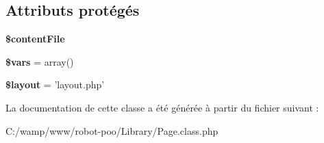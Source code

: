 \subsection*{Attributs protégés}
\begin{DoxyCompactItemize}
\item 
\hypertarget{class_library_1_1_page_a0eabc4b2c6966b79d36c81c4fa3ad3a8}{{\bfseries \$content\+File}}\label{class_library_1_1_page_a0eabc4b2c6966b79d36c81c4fa3ad3a8}

\item 
\hypertarget{class_library_1_1_page_a09f2c833c130b4443725fb576d9d5269}{{\bfseries \$vars} = array()}\label{class_library_1_1_page_a09f2c833c130b4443725fb576d9d5269}

\item 
\hypertarget{class_library_1_1_page_a2b0d08e73a90b9443ce37506b7c6a544}{{\bfseries \$layout} = 'layout.\+php'}\label{class_library_1_1_page_a2b0d08e73a90b9443ce37506b7c6a544}

\end{DoxyCompactItemize}


La documentation de cette classe a été générée à partir du fichier suivant \+:\begin{DoxyCompactItemize}
\item 
C\+:/wamp/www/robot-\/poo/\+Library/Page.\+class.\+php\end{DoxyCompactItemize}
